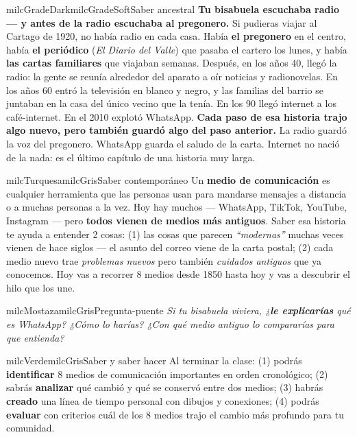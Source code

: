 \documentclass[11pt,letterpaper]{article}
\begin{document}
\begin{softbox}{milcGradeDark}{milcGradeSoft}{Saber ancestral}
\textbf{Tu bisabuela escuchaba radio --- y antes de la radio escuchaba al pregonero.} Si pudieras viajar al Cartago de 1920, no había radio en cada casa. Había \textbf{el pregonero} en el centro, había \textbf{el periódico} (\emph{El Diario del Valle}) que pasaba el cartero los lunes, y había \textbf{las cartas familiares} que viajaban semanas. Después, en los años 40, llegó la radio: la gente se reunía alrededor del aparato a oír noticias y radionovelas. En los años 60 entró la televisión en blanco y negro, y las familias del barrio se juntaban en la casa del único vecino que la tenía. En los 90 llegó internet a los café-internet. En el 2010 explotó WhatsApp. \textbf{Cada paso de esa historia trajo algo nuevo, pero también guardó algo del paso anterior.} La radio guardó la voz del pregonero. WhatsApp guarda el saludo de la carta. Internet no nació de la nada: es el último capítulo de una historia muy larga.
\end{softbox}

\begin{softbox}{milcTurquesa}{milcGris}{Saber contemporáneo}
Un \textbf{medio de comunicación} es cualquier herramienta que las personas usan para mandarse mensajes a distancia o a muchas personas a la vez. Hoy hay muchos --- WhatsApp, TikTok, YouTube, Instagram --- pero \textbf{todos vienen de medios más antiguos}. Saber esa historia te ayuda a entender 2 cosas: (1) las cosas que parecen \emph{``modernas''} muchas veces vienen de hace siglos --- el asunto del correo viene de la carta postal; (2) cada medio nuevo trae \emph{problemas nuevos} pero también \emph{cuidados antiguos} que ya conocemos. Hoy vas a recorrer 8 medios desde 1850 hasta hoy y vas a descubrir el hilo que los une.
\end{softbox}

\begin{softbox}{milcMostaza}{milcGris}{Pregunta-puente}
\textit{Si tu bisabuela viviera, ¿\textbf{le explicarías} qué es WhatsApp? ¿Cómo lo harías? ¿Con qué medio antiguo lo compararías para que entienda?}
\end{softbox}

\begin{softbox}{milcVerde}{milcGris}{Saber y saber hacer}
Al terminar la clase: (1) podrás \textbf{identificar} 8 medios de comunicación importantes en orden cronológico; (2) sabrás \textbf{analizar} qué cambió y qué se conservó entre dos medios; (3) habrás \textbf{creado} una línea de tiempo personal con dibujos y conexiones; (4) podrás \textbf{evaluar} con criterios cuál de los 8 medios trajo el cambio más profundo para tu comunidad.
\end{softbox}
\end{document}
